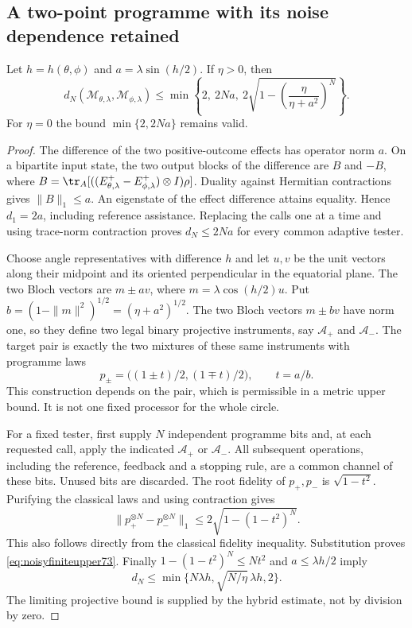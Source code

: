 \subsection{A two-point programme with its noise dependence retained}
\begin{lemma}\label{lem:noisyupper73}
Let $h=h(\theta,\phi)$ and $a=\lambda\sin(h/2)$. If $\eta>0$, then
\begin{equation}\label{eq:noisyfiniteupper73}
 d_N(\mathcal M_{\theta,\lambda},\mathcal M_{\phi,\lambda})
 \le\min\left\{2,\ 2Na,\
             2\sqrt{1-\left(\frac{\eta}{\eta+a^2}\right)^N}\right\}.
\end{equation}
For $\eta=0$ the bound $\min\{2,2Na\}$ remains valid.
\end{lemma}
\begin{proof}
The difference of the two positive-outcome effects has operator norm
$a$. On a bipartite input state, the two output blocks of the difference
are $B$ and $-B$, where
$B=\tr_A[((E^+_{\theta,\lambda}-E^+_{\phi,\lambda})\otimes I)\rho]$.
Duality against Hermitian contractions gives $\|B\|_1\le a$.
An eigenstate of the effect difference attains equality. Hence
$d_1=2a$, including reference assistance. Replacing the calls one at a
time and using trace-norm contraction proves $d_N\le2Na$ for every
common adaptive tester.

Choose angle representatives with difference $h$ and let $u,v$ be the
unit vectors along their midpoint and its oriented perpendicular in
the equatorial plane. The two Bloch vectors are $m\pm av$, where
$m=\lambda\cos(h/2)u$. Put
$b=(1-\|m\|^2)^{1/2}=(\eta+a^2)^{1/2}$.
The two Bloch vectors $m\pm bv$ have norm one, so they define two legal
binary projective instruments, say $\mathcal A_+$ and $\mathcal A_-$.
The target pair is exactly the two mixtures of these same instruments
with programme laws
\[
 p_\pm=\bigl((1\pm t)/2,(1\mp t)/2\bigr),\qquad t=a/b.
\]
This construction depends on the pair, which is permissible in a
metric upper bound. It is not one fixed processor for the whole circle.

For a fixed tester, first supply $N$ independent programme bits and,
at each requested call, apply the indicated $\mathcal A_+$ or
$\mathcal A_-$. All subsequent operations, including the reference,
feedback and a stopping rule, are a common channel of these bits.
Unused bits are discarded. The root fidelity of $p_+,p_-$ is
$\sqrt{1-t^2}$. Purifying the classical laws and using contraction gives
\[
 \|p_+^{\otimes N}-p_-^{\otimes N}\|_1
 \le2\sqrt{1-(1-t^2)^N}.
\]
This also follows directly from the classical fidelity inequality.
Substitution proves \eqref{eq:noisyfiniteupper73}.
Finally $1-(1-t^2)^N\le Nt^2$ and $a\le\lambda h/2$ imply
\[
 d_N\le\min\{N\lambda h,\sqrt{N/\eta}\,\lambda h,2\}.
\]
The limiting projective bound is supplied by the hybrid estimate,
not by division by zero.
\end{proof}
